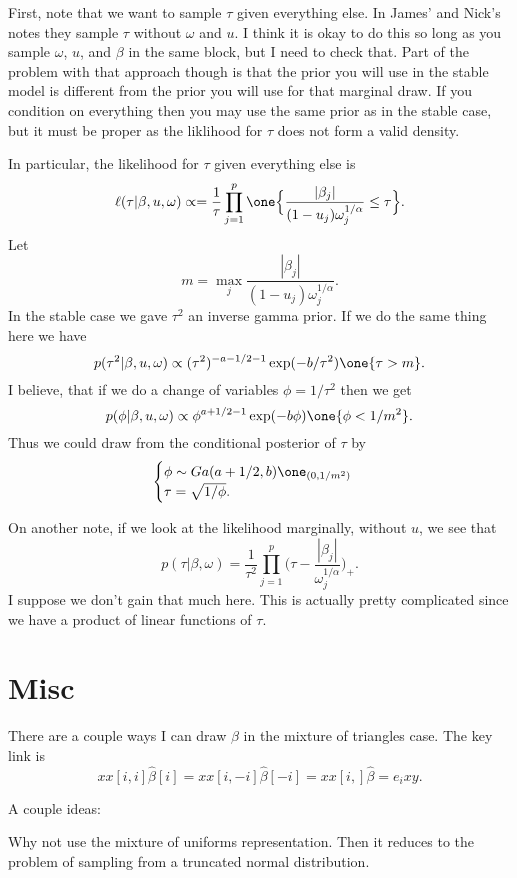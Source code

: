 \documentclass{article}
\begin{document}
First, note that we want to sample $\tau$ given everything else.  In James' and
Nick's notes they sample $\tau$ without $\omega$ and $u$.  I think it is okay to
do this so long as you sample $\omega$, $u$, and $\beta$ in the same block, but
I need to check that.  Part of the problem with that approach though is that the
prior you will use in the stable model is different from the prior you will use
for that marginal draw.  If you condition on everything then you may use the
same prior as in the stable case, but it must be proper as the liklihood for
$\tau$ does not form a valid density.

In particular, the likelihood for $\tau$ given everything else is
\[
\ell(\tau | \beta, u, \omega) \propto = \frac{1}{\tau} 
\prod_{j=1}^p \one \Big\{ \frac{|\beta_j|}{(1-u_j) \omega_j^{1/\alpha}} \leq \tau \Big\}.
\]
Let
\[
m = \max_j \frac{|\beta_j|}{(1-u_j) \omega_j^{1/\alpha}}.
\]
In the stable case we gave $\tau^2$ an inverse gamma prior.  If we do the same
thing here we have
\[
p(\tau^2 | \beta, u, \omega) \propto (\tau^2)^{-a - 1/2 - 1} \exp ( - b / \tau^2)
\one \{\tau > m\}.
\]
I believe, that if we do a change of variables $\phi = 1/\tau^2$ then we get
\[
p(\phi | \beta, u, \omega) \propto \phi^{a+1/2-1} \exp(-b \phi) \one \{\phi < 1/m^2\}.
\]
Thus we could draw from the conditional posterior of $\tau$ by
\[
\begin{cases}
\phi \sim Ga(a+1/2, b) \one_{(0, 1/m^2)} \\
\tau = \sqrt{ 1/\phi }.
\end{cases}
\]

On another note, if we look at the likelihood marginally, without $u$, we see
that
\[
p(\tau | \beta, \omega) = \frac{1}{\tau^2} 
\prod_{j=1}^p \Big( \tau - \frac{|\beta_j|}{\omega_j^{1/\alpha}} \Big)_+.
\]
I suppose we don't gain that much here.  This is actually pretty complicated
since we have a product of linear functions of $\tau$.

\section{Misc}

There are a couple ways I can draw $\beta$ in the mixture of triangles case.
The key link is
\[
xx[i,i] \hat \beta[i] = xx[i,-i] \hat \beta[-i] = xx[i,] \hat \beta = e_i xy.
\]

A couple ideas:

Why not use the mixture of uniforms representation.  Then it reduces to the
problem of sampling from a truncated normal distribution.
\end{document}
